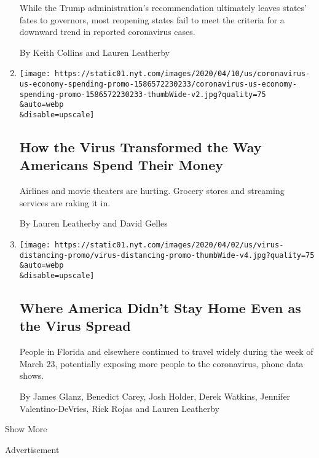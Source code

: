 \begin{enumerate}
  While the Trump administration's recommendation ultimately leaves
  states' fates to governors, most reopening states fail to meet the
  criteria for a downward trend in reported coronavirus cases.

  By Keith Collins and Lauren Leatherby
\item
  \href{/interactive/2020/04/11/business/economy/coronavirus-us-economy-spending.html}{}

  \texttt{[image: https://static01.nyt.com/images/2020/04/10/us/coronavirus-us-economy-spending-promo-1586572230233/coronavirus-us-economy-spending-promo-1586572230233-thumbWide-v2.jpg?quality=75\\\&auto=webp\\\&disable=upscale]}

  \hypertarget{how-the-virus-transformed-the-way-americans-spend-their-money}{%
  \subsection{How the Virus Transformed the Way Americans Spend Their
  Money}\label{how-the-virus-transformed-the-way-americans-spend-their-money}}

  Airlines and movie theaters are hurting. Grocery stores and streaming
  services are raking it in.

  By Lauren Leatherby and David Gelles
\item
  \href{/interactive/2020/04/02/us/coronavirus-social-distancing.html}{}

  \texttt{[image: https://static01.nyt.com/images/2020/04/02/us/virus-distancing-promo/virus-distancing-promo-thumbWide-v4.jpg?quality=75\\\&auto=webp\\\&disable=upscale]}

  \hypertarget{where-america-didnt-stay-home-even-as-the-virus-spread}{%
  \subsection{Where America Didn't Stay Home Even as the Virus
  Spread}\label{where-america-didnt-stay-home-even-as-the-virus-spread}}

  People in Florida and elsewhere continued to travel widely during the
  week of March 23, potentially exposing more people to the coronavirus,
  phone data shows.

  By James Glanz, Benedict Carey, Josh Holder, Derek Watkins, Jennifer
  Valentino-DeVries, Rick Rojas and Lauren Leatherby
\end{enumerate}

Show More

Advertisement

